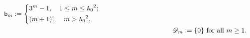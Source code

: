 \documentclass[12pt, twoside]{article}
\theoremstyle{definition}
\numberwithin{equation}{section}
\begin{document}
\begin{itemize}
\begin{align}
		\mathtt b_m := \left\{\begin{aligned}
			&3^m - 1,\quad 1 \le  m  \le {\mathtt A_0}^2;\\
			& (m + 1)!,\quad  m > {\mathtt A_0}^2,
		\end{aligned}\right.\label{pi-2} \\
		&\hskip1.5in \mathscr{D}_m := \{0\} \text{ for all } m \geq 1.\label{pi-3}
	\end{align}
\end{itemize}
\end{document}
